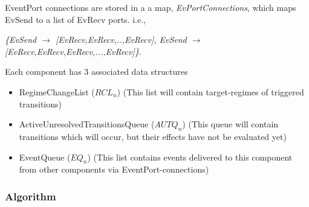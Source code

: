 \documentclass[draftspec]{ninemlspec}
\begin{document}
\noindent EventPort connections are stored in a a map,
\textsl{EvPortConnections}, which maps EvSend to a list of EvRecv ports. i.e.,

\textsl{\{EvSend $\rightarrow$ [EvRecv,EvRecv,..,EvRecv], EvSend $\rightarrow$
[EvRecv,EvRecv,EvRecv,...,EvRecv]\}}.

\newcommand{\RCLn}{$RCL_n$}
\newcommand{\AUTQn}{$AUTQ_n$}
\newcommand{\EQn}{$EQ_n$}

\noindent Each component has 3 associated data structures
\begin{itemize}
\item RegimeChangeList (\RCLn) (This list will contain target-regimes of
triggered transitions)
\item ActiveUnresolvedTransitionsQueue (\AUTQn) (This queue will
contain transitions which will occur, but their effects have not be
evaluated yet)
\item EventQueue (\EQn) (This list contains events delivered to this
component from other components via EventPort-connections)
\end{itemize}

\subsubsection{Algorithm}
\end{document}
